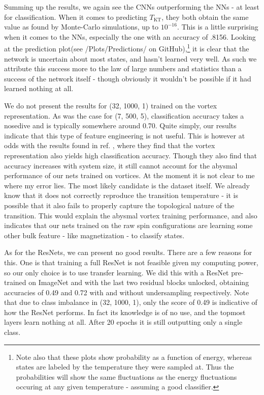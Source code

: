 \documentclass[]{article}
\begin{document}
Summing up the results, we again see the CNNs outperforming the NNs - at least for classification. When it comes to predicting $T_\text{KT}$, they both obtain the same value as found by Monte-Carlo simulations, up to $10^{-16}$. This is a little surprising when it comes to the NNs, especially the one with an accuracy of .8156. Looking at the prediction plot(see /Plots/Predictions/ on GitHub),\footnote{Note also that these plots show probability as a function of energy, whereas states are labeled by the temperature they were sampled at. Thus the probabilities will show the same fluctuations as the energy fluctuations occuring at any given temperature - assuming a good classifier. }  it is clear that the network is uncertain about most states, and hasn't learned very well. As such we attribute this success more to the law of large numbers and statistics than a success of the network itself - though obviously it wouldn't be possible if it had learned nothing at all. 

We do not present the results for (32, 1000, 1) trained on the vortex representation. As was the case for (7, 500, 5), classification accuracy takes a nosedive and is typically somewhere around 0.70. Quite simply, our results indicate that this type of feature engineering is not useful. This is however at odds with the results found in ref. \cite{PhysRevB.97.045207}, where they find that the vortex representation also yields high classification accuracy. Though they also find that accuracy increases with system size, it still cannot account for the abysmal performance of our nets trained on vortices. At the moment it is not clear to me where my error lies. The most likely candidate is the dataset itself. We already know that it does not correctly reproduce the transition temperature - it is possible that it also fails to properly capture the topological nature of the transition. This would explain the abysmal vortex training performance, and also indicates that our nets trained on the raw spin configurations are learning some other bulk feature - like magnetization - to classify states.


As for the ResNets, we can present no good results. There are a few reasons for this. One is that training a full ResNet is not feasible given my computing power, so our only choice is to use transfer learning. We did this with a ResNet pre-trained on ImageNet and with the last two residual blocks unlocked, obtaining accuracies of 0.49 and 0.72 with and without undersampling respectively. Note that due to class imbalance in (32, 1000, 1), only the score of 0.49 is indicative of how the ResNet performs. In fact its knowledge is of no use, and the topmost layers learn nothing at all. After 20 epochs it is still outputting only a single class. 
\end{document}
